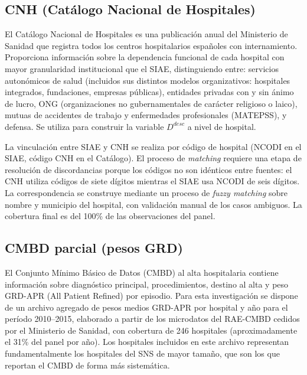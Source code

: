 \subsection{CNH (Catálogo Nacional de Hospitales)}

El Catálogo Nacional de Hospitales es una publicación anual del Ministerio de Sanidad que registra todos los centros hospitalarios españoles con internamiento. Proporciona información sobre la dependencia funcional de cada hospital con mayor granularidad institucional que el SIAE, distinguiendo entre: servicios autonómicos de salud (incluidos sus distintos modelos organizativos: hospitales integrados, fundaciones, empresas públicas), entidades privadas con y sin ánimo de lucro, ONG (organizaciones no gubernamentales de carácter religioso o laico), mutuas de accidentes de trabajo y enfermedades profesionales (MATEPSS), y defensa. Se utiliza para construir la variable $D^{desc}$ a nivel de hospital.

La vinculación entre SIAE y CNH se realiza por código de hospital (NCODI en el SIAE, código CNH en el Catálogo). El proceso de \textit{matching} requiere una etapa de resolución de discordancias porque los códigos no son idénticos entre fuentes: el CNH utiliza códigos de siete dígitos mientras el SIAE usa NCODI de seis dígitos. La correspondencia se construye mediante un proceso de \textit{fuzzy matching} sobre nombre y municipio del hospital, con validación manual de los casos ambiguos. La cobertura final es del 100\% de las observaciones del panel.

\subsection{CMBD parcial (pesos GRD)}

El Conjunto Mínimo Básico de Datos (CMBD) al alta hospitalaria contiene información sobre diagnóstico principal, procedimientos, destino al alta y peso GRD-APR (All Patient Refined) por episodio. Para esta investigación se dispone de un archivo agregado de pesos medios GRD-APR por hospital y año para el período 2010--2015, elaborado a partir de los microdatos del RAE-CMBD cedidos por el Ministerio de Sanidad, con cobertura de 246 hospitales (aproximadamente el 31\% del panel por año). Los hospitales incluidos en este archivo representan fundamentalmente los hospitales del SNS de mayor tamaño, que son los que reportan el CMBD de forma más sistemática.

